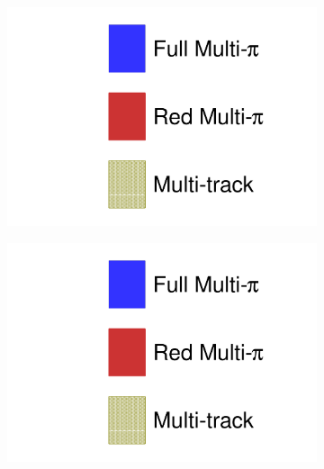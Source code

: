 \begin{figure}[h]
	\begin{subfigure}[t]{0.32\textwidth}
		\includegraphics[width=\textwidth, trim={0mm 0mm 0mm 0mm}, clip, page=2]{figures/mach3/2018/data/2018_results_test_spectra_2018_results_test_redcov_spectra_2018_results_test_multitrack_spectra}
	\end{subfigure}
	\begin{subfigure}[t]{0.32\textwidth}
		\includegraphics[width=\textwidth, trim={0mm 0mm 0mm 0mm}, clip, page=3]{figures/mach3/2018/data/2018_results_test_spectra_2018_results_test_redcov_spectra_2018_results_test_multitrack_spectra}
	\end{subfigure}
	\begin{subfigure}[t]{0.32\textwidth}

\end{subfigure}
\end{figure}
